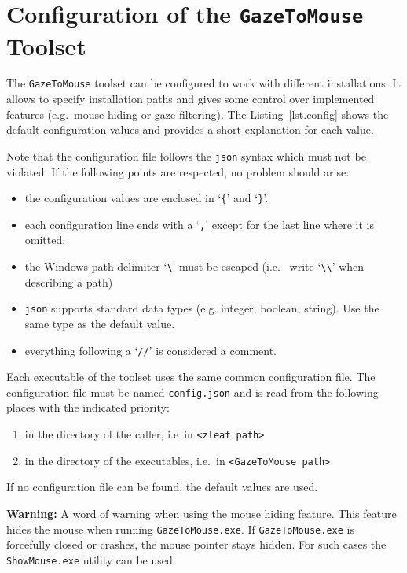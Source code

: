 \documentclass[a4paper,oneside]{book}
\begin{document}
\chapter{Configuration of the \texttt{GazeToMouse} Toolset}
\label{sec.config}
The \texttt{GazeToMouse} toolset can be configured to work with different installations.
It allows to specify installation paths and gives some control over implemented features (e.g.~mouse hiding or gaze filtering).
The Listing~\ref{lst.config} shows the default configuration values and provides a short explanation for each value.



Note that the configuration file follows the \texttt{json} syntax which must not be violated.
If the following points are respected, no problem should arise:
\begin{itemize}
    \item the configuration values are enclosed in `\texttt{\{}' and `\texttt{\}}'.
    \item each configuration line ends with a `\texttt{,}' except for the last line where it is omitted.
    \item the Windows path delimiter `\texttt{\textbackslash}' must be escaped (i.e.~ write `\texttt{\textbackslash\textbackslash}' when describing a path)
    \item \texttt{json} supports standard data types (e.g. integer, boolean, string).
        Use the same type as the default value.
    \item everything following a `\texttt{//}' is considered a comment.
\end{itemize}

Each executable of the toolset uses the same common configuration file.
The configuration file must be named \texttt{config.json} and is read from the following places with the indicated priority:
\begin{enumerate}
    \item in the directory of the caller, i.e~in \texttt{<zleaf path>}
    \item in the directory of the executables, i.e.~in \texttt{<GazeToMouse path>}
\end{enumerate}
If no configuration file can be found, the default values are used.

\begin{mdframed}[backgroundcolor=boxbkg]\textbf{\color{red}Warning:}
    A word of warning when using the mouse hiding feature.
    This feature hides the mouse when running \texttt{GazeToMouse.exe}.
    If \texttt{GazeToMouse.exe} is forcefully closed or crashes, the mouse pointer stays hidden.
    For such cases the \texttt{ShowMouse.exe} utility can be used.
\end{mdframed}
\end{document}
